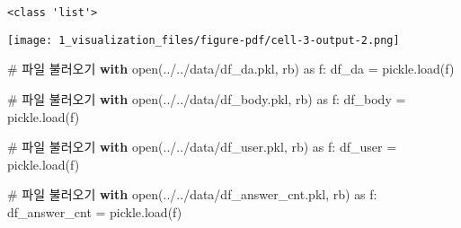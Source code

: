 \documentclass[
  letterpaper,
  DIV=11,
  numbers=noendperiod]{scrartcl}
\newenvironment{Shaded}{\begin{snugshade}}{\end{snugshade}}
\newcommand{\BuiltInTok}[1]{\textcolor[rgb]{0.00,0.23,0.31}{#1}}
\newcommand{\CommentTok}[1]{\textcolor[rgb]{0.37,0.37,0.37}{#1}}
\newcommand{\ControlFlowTok}[1]{\textcolor[rgb]{0.00,0.23,0.31}{\textbf{#1}}}
\newcommand{\ImportTok}[1]{\textcolor[rgb]{0.00,0.46,0.62}{#1}}
\newcommand{\NormalTok}[1]{\textcolor[rgb]{0.00,0.23,0.31}{#1}}
\newcommand{\OperatorTok}[1]{\textcolor[rgb]{0.37,0.37,0.37}{#1}}
\newcommand{\StringTok}[1]{\textcolor[rgb]{0.13,0.47,0.30}{#1}}
\begin{document}
\begin{verbatim}
<class 'list'>
\end{verbatim}

\texttt{[image: 1\_visualization\_files/figure-pdf/cell-3-output-2.png]}

\begin{Shaded}
\begin{Highlighting}[]
\CommentTok{\# 파일 불러오기}
\ControlFlowTok{with} \BuiltInTok{open}\NormalTok{(}\StringTok{\textquotesingle{}../../data/df\_da.pkl\textquotesingle{}}\NormalTok{, }\StringTok{\textquotesingle{}rb\textquotesingle{}}\NormalTok{) }\ImportTok{as}\NormalTok{ f:}
\NormalTok{    df\_da }\OperatorTok{=}\NormalTok{ pickle.load(f)}
\end{Highlighting}
\end{Shaded}

\begin{Shaded}
\begin{Highlighting}[]
\CommentTok{\# 파일 불러오기}
\ControlFlowTok{with} \BuiltInTok{open}\NormalTok{(}\StringTok{\textquotesingle{}../../data/df\_body.pkl\textquotesingle{}}\NormalTok{, }\StringTok{\textquotesingle{}rb\textquotesingle{}}\NormalTok{) }\ImportTok{as}\NormalTok{ f:}
\NormalTok{    df\_body }\OperatorTok{=}\NormalTok{ pickle.load(f)}
\end{Highlighting}
\end{Shaded}

\begin{Shaded}
\begin{Highlighting}[]
\CommentTok{\# 파일 불러오기}
\ControlFlowTok{with} \BuiltInTok{open}\NormalTok{(}\StringTok{\textquotesingle{}../../data/df\_user.pkl\textquotesingle{}}\NormalTok{, }\StringTok{\textquotesingle{}rb\textquotesingle{}}\NormalTok{) }\ImportTok{as}\NormalTok{ f:}
\NormalTok{    df\_user }\OperatorTok{=}\NormalTok{ pickle.load(f)}
\end{Highlighting}
\end{Shaded}

\begin{Shaded}
\begin{Highlighting}[]
\CommentTok{\# 파일 불러오기}
\ControlFlowTok{with} \BuiltInTok{open}\NormalTok{(}\StringTok{\textquotesingle{}../../data/df\_answer\_cnt.pkl\textquotesingle{}}\NormalTok{, }\StringTok{\textquotesingle{}rb\textquotesingle{}}\NormalTok{) }\ImportTok{as}\NormalTok{ f:}
\NormalTok{    df\_answer\_cnt }\OperatorTok{=}\NormalTok{ pickle.load(f)}
\end{Highlighting}
\end{Shaded}
\end{document}
